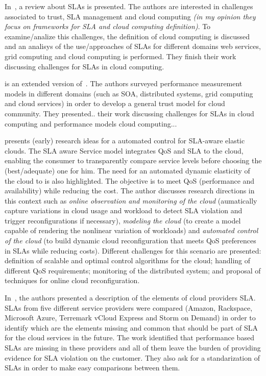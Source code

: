 \documentclass[12pt,a4paper,oneside]{book}
\begin{document}
\bigskip
In~\cite{003}, a review about SLAs is presented. The authors are interested in challenges associated to trust, SLA management and cloud computing \textit{(in my opinion they focus on frameworks for SLA and cloud computing definition)}. To examine/analize this challenges, the definition of cloud computing is discussed and an analisys of the use/approaches of SLAs for different domains web services, grid computing and cloud computing is performed. They finish their work discussing challenges for SLAs in cloud computing.

\bigskip
\cite{004} is an extended version of~\cite{003}. The authors surveyed performance measurement models in different domains (such as SOA, distributed systems, grid computing and cloud services) in order to develop a general trust model for cloud community. They presented.. their work discussing challenges for SLAs in cloud computing and performance models cloud computing...

\bigskip
\cite{013} presents (early) research ideas for a automated control for SLA-aware elastic clouds. The SLA aware Service model integrates QoS and SLA to the cloud, enabling the consumer to transparently compare service levels before choosing the (best/adequate) one for him. The need for an automated dynamic elasticity of the cloud to is also highlighted. The objective is to meet QoS (performance and availability) while reducing the cost. The author discusses research directions in this context such as \textit{online observation and monitoring of the cloud} (aumatically capture variations in cloud usage and workload to detect SLA violation and trigger reconfigurations if necessary), \textit{modeling the cloud} (to create a model capable of rendering the nonlinear variation of workloads) and \textit{automated control of the cloud} (to build dynamic cloud reconfiguration that meets QoS preferences in SLAs while reducing costs). Different challenges for this scenario are presented: definition of scalable and optimal control algorithms for the cloud; handling of different QoS requirements; monitoring of the distributed system; and proposal of techniques for online cloud reconfiguration.

\bigskip
In~\cite{010}, the authors presented a description of the elements of cloud providers SLA. SLAs from five different service providers were compared (Amazon, Rackspace, Microsoft Azure, Terremark vCloud Express and Storm on Demand) in order to identify which are the elements missing and common that should be part of SLA for the cloud services in the future. The work identified that performance based SLAs are missing in these providers and all of them leave the burden of providing evidence for SLA violation on the customer. They also ask for a standarization of SLAs in order to make easy comparisons between them.
\end{document}
